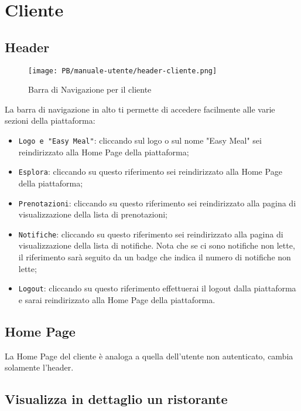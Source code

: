 \section{Cliente}

\subsection{Header}

\begin{figure}[htbp]
    \centering
	\texttt{[image: PB/manuale-utente/header-cliente.png]}
    \caption{Barra di Navigazione per il cliente}
\end{figure}

La barra di navigazione in alto ti permette di accedere facilmente alle varie 
sezioni della piattaforma:
\begin{itemize}
	\item \texttt{Logo e "Easy Meal"}: cliccando sul logo o sul nome "Easy Meal"
		sei reindirizzato alla Home Page della piattaforma;

	\item \texttt{Esplora}: cliccando su questo riferimento sei reindirizzato
		alla Home Page della piattaforma;

	\item \texttt{Prenotazioni}: cliccando su questo riferimento sei 
		reindirizzato alla pagina di visualizzazione della lista di
		prenotazioni;

	\item \texttt{Notifiche}: cliccando su questo riferimento sei reindirizzato
		alla pagina di visualizzazione della lista di notifiche. Nota che se ci
		sono notifiche non lette, il riferimento sarà seguito da un badge che
		indica il numero di notifiche non lette;

	\item \texttt{Logout}: cliccando su questo riferimento effettuerai il logout
		dalla piattaforma e sarai reindirizzato alla Home Page della 
		piattaforma.
\end{itemize}

\subsection{Home Page}

La Home Page del cliente è analoga a quella dell'utente non autenticato, cambia
solamente l'header.

\subsection{Visualizza in dettaglio un ristorante}

